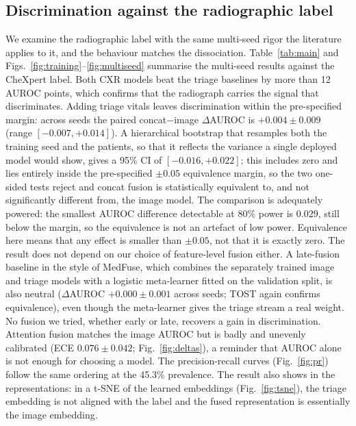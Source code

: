 \documentclass[twocolumn, final]{svjour3}
\begin{document}
\subsection{Discrimination against the radiographic label}
\label{subsec:disc}
We examine the radiographic label with the same multi-seed rigor the literature applies to
it, and the behaviour matches the dissociation. Table~\ref{tab:main} and
Figs.~\ref{fig:training}--\ref{fig:multiseed} summarise the multi-seed results against the
CheXpert label. Both CXR models beat the triage baselines by more than 12 AUROC points, which
confirms that the radiograph carries the signal that discriminates. Adding triage
vitals leaves discrimination within the pre-specified margin: across seeds the paired
concat$-$image $\Delta$AUROC is $+0.004\pm0.009$ (range $[-0.007,+0.014]$). A hierarchical
bootstrap that resamples both the training seed and the patients, so that it reflects the
variance a single deployed model would show, gives a 95\% CI of $[-0.016,+0.022]$; this
includes zero and lies entirely inside the pre-specified $\pm0.05$ equivalence margin, so
the two one-sided tests reject and concat fusion is statistically equivalent to, and not
significantly different from, the image model. The comparison is adequately powered: the
smallest AUROC difference detectable at 80\% power is $0.029$, still below the margin, so
the equivalence is not an artefact of low power. Equivalence here means that any effect is
smaller than $\pm0.05$, not that it is exactly zero. The result does not depend on our choice of
feature-level fusion either. A late-fusion baseline in the style of MedFuse, which
combines the separately trained image and triage models with a logistic meta-learner
fitted on the validation split, is also neutral ($\Delta$AUROC $+0.000\pm0.001$ across
seeds; TOST again confirms equivalence), even though the meta-learner gives the triage
stream a real weight. No fusion we tried, whether early or late, recovers a gain in
discrimination. Attention fusion matches the image AUROC but is badly and unevenly
calibrated (ECE $0.076\pm0.042$; Fig.~\ref{fig:deltas}), a reminder that AUROC alone is
not enough for choosing a model. The precision-recall curves (Fig.~\ref{fig:pr}) follow
the same ordering at the 45.3\% prevalence. The result also shows in the
representations: in a t-SNE of the learned embeddings (Fig.~\ref{fig:tsne}), the triage
embedding is not aligned with the label and the fused representation is essentially the
image embedding.
\end{document}
